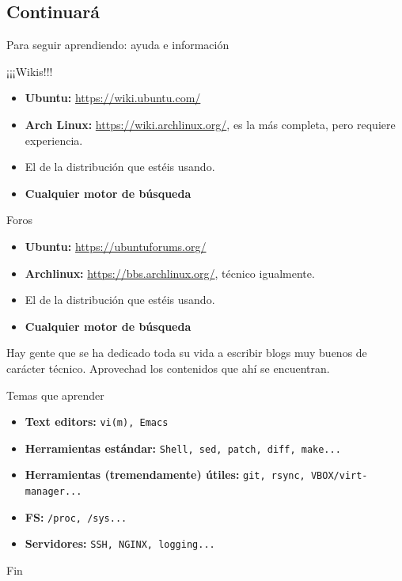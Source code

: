 \documentclass[12pt]{beamer}
\begin{document}
\subsection{Continuará}
\begin{frame}[allowframebreaks]{Para seguir aprendiendo: ayuda e información}
	\begin{block}{¡¡¡Wikis!!!}
		\begin{itemize}
			\item \textbf{Ubuntu:} \href{https://wiki.ubuntu.com/}{https://wiki.ubuntu.com/}
			\item \textbf{Arch Linux:} \href{https://wiki.archlinux.org/}{https://wiki.archlinux.org/}, es la más completa, pero requiere experiencia.
			\item El de la distribución que estéis usando.
			\item \textbf{Cualquier motor de búsqueda}
		\end{itemize}
	\end{block}
	\begin{block}{Foros}
		\begin{itemize}
			\item \textbf{Ubuntu:} \href{https://ubuntuforums.org/}{https://ubuntuforums.org/}
			\item \textbf{Archlinux:} \href{https://bbs.archlinux.org/}{https://bbs.archlinux.org/}, técnico igualmente.
			\item El de la distribución que estéis usando.
			\item \textbf{Cualquier motor de búsqueda}
		\end{itemize}
	\end{block}
	Hay gente que se ha dedicado toda su vida a escribir blogs muy buenos de carácter técnico. Aprovechad los contenidos que ahí se encuentran.
\end{frame}

\begin{frame}{Temas que aprender}
	\begin{itemize}
		\item \textbf{Text editors:} \texttt{vi(m), Emacs}
		\item \textbf{Herramientas estándar:} \texttt{Shell, sed, patch, diff, make...}
		\item \textbf{Herramientas (tremendamente) útiles:} \texttt{git, rsync, VBOX/virt-manager...}
		\item \textbf{FS:} \texttt{/proc, /sys...}
		\item \textbf{Servidores:} \texttt{SSH, NGINX, logging...}
	\end{itemize}
\end{frame}

\begin{frame}{Fin}
	
\end{frame}
\end{document}
